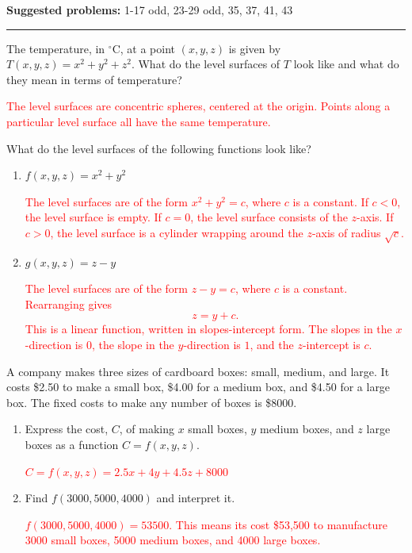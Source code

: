 \documentclass[12pt,reqno]{amsart}
\begin{document}
\textbf{Suggested problems:} 1-17 odd, 23-29 odd, 35, 37, 41, 43

\bigskip
\hrule

\bigskip

\prob The temperature, in $^\circ$C, at a point $(x,y,z)$ is given by $T(x,y,z) = x^2+y^2+z^2$. What do the level surfaces of $T$ look like and what do they mean in terms of temperature?

\bigskip
\textcolor{red}{The level surfaces are concentric spheres, centered at the origin. Points along a particular level surface all have the same temperature.}
\bigskip

\prob What do the level surfaces of the following functions look like?

\medskip
\begin{enumerate}
\item $f(x,y,z) = x^2+y^2$

\bigskip
\textcolor{red}{The level surfaces are of the form $x^2+y^2=c$, where $c$ is a constant. If $c<0$, the level surface is empty. If $c=0$, the level surface consists of the $z$-axis. If $c>0$, the level surface is a cylinder wrapping around the $z$-axis of radius $\sqrt{c}$.}
\bigskip

\item $g(x,y,z) = z-y$

\bigskip
\textcolor{red}{The level surfaces are of the form $z-y=c$, where $c$ is a constant. Rearranging gives
	\[z = y + c.
	\]
This is a linear function, written in slopes-intercept form. The slopes in the $x$-direction is $0$, the slope in the $y$-direction is $1$, and the $z$-intercept is $c$.}
\bigskip
\end{enumerate}

\prob A company makes three sizes of cardboard boxes: small, medium, and large. It costs \$2.50 to make a small box, \$4.00 for a medium box, and \$4.50 for a large box. The fixed costs to make any number of boxes is \$8000.

\medskip
\begin{enumerate}
\item Express the cost, $C$, of making $x$ small boxes, $y$ medium boxes, and $z$ large boxes as a function $C = f(x,y,z)$.

\bigskip
\textcolor{red}{$C = f(x,y,z) = 2.5x + 4y + 4.5z + 8000$}
\bigskip

\item Find $f(3000,5000,4000)$ and interpret it.

\bigskip
\textcolor{red}{$f(3000,5000,4000) = 53500$. This means its cost \$53,500 to manufacture 3000 small boxes, 5000 medium boxes, and 4000 large boxes.}
\bigskip

\end{enumerate}
\end{document}
